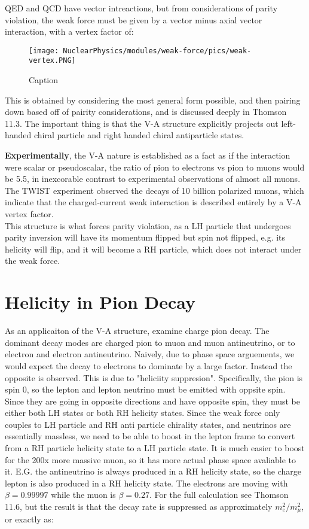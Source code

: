         
        QED and QCD have vector intreactions, but from considerations of parity violation, the weak force must be given by a vector minus axial vector interaction, with a vertex factor of:
        
            \begin{figure}[H]
                \centering
                \texttt{[image: NuclearPhysics/modules/weak-force/pics/weak-vertex.PNG]}
            \caption{Caption}
            \end{figure}
            
        
        This is obtained by considering the most general form possible, and then pairing down based off of pairity considerations, and is discussed deeply in Thomson 11.3. The important thing is that the V-A structure explicitly projects out left-handed chiral particle and right handed chiral antiparticle states.  
        
        \textbf{Experimentally}, the V-A nature is established as a fact as if the interaction were scalar or pseudoscalar, the ratio of pion to electrons vs pion to muons would be 5.5, in inexcorable contrast to experimental observations of almost all muons. The TWIST experiment observed the decays of 10 billion polarized muons, which indicate that the charged-current weak interaction is described entirely by a V-A vertex factor.\\
        
        This structure is what forces parity violation, as a LH particle that undergoes parity inversion will have its momentum flipped but spin not flipped, e.g. its helicity will flip, and it will become a RH particle, which does not interact under the weak force. 
        
    \section{Helicity in Pion Decay}
        As an applicaiton of the V-A structure, examine charge pion decay. The dominant decay modes are charged pion to muon and muon antineutrino, or to electron and electron antineutrino. Naively, due to phase space arguements, we would expect the decay to electrons to dominate by a large factor. Instead the opposite is observed. This is due to "heliciity suppresion". Specifically, the pion is spin 0, so the lepton and lepton neutrino must be emitted with oppsite spin. Since they are going in opposite directions and have opposite spin, they must be either both LH states or both RH helicity states. Since the weak force only couples to LH particle and RH anti particle chirality states, and neutrinos are essentially massless, we need to be able to boost in the lepton frame to convert from a RH particle helicity state to a LH particle state. It is much easier to boost for the 200x more massive muon, so it has more actual phase space avaliable to it. E.G. the antineutrino is always produced in a RH helicity state, so the charge lepton is also produced in a RH helicity state. The electrons are moving with $\beta = 0.99997$ while the muon is $\beta = 0.27$. For the full calculation see Thomson 11.6, but the result is that the decay rate is suppressed as approximately $m_e^2/m_{\mu}^2$, or exactly as:
        
